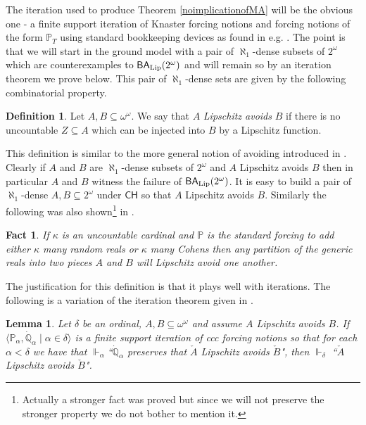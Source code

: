 \documentclass[leqno,11pt]{amsart}
\newtheorem{lemma}[theorem]{Lemma}
\newtheorem{fact}[theorem]{Fact}
\theoremstyle{definition}
\newtheorem{definition}[theorem]{Definition}
\theoremstyle{remark}
\def\forces{\Vdash}
\def\BA{\mathsf{BA}}
\def\baire{\omega^\omega}
\def\cantor{2^\omega}
\def\CH {\mathsf{CH}}
\def\Q{\mathbb Q}
\def\P{\mathbb P}
\begin{document}
The iteration used to produce Theorem \ref{noimplicationofMA} will be the obvious one - a finite support iteration of Knaster forcing notions and forcing notions of the form $\P_T$ using standard bookkeeping devices as found in e.g. \cite[Chapter 5]{KenST}. The point is that we will start in the ground model with a pair of $\aleph_1$-dense subsets of $\cantor$ which are counterexamples to $\BA_{\rm Lip}(\cantor)$ and will remain so by an iteration theorem we prove below. This pair of $\aleph_1$-dense sets are given by the following combinatorial property.

\begin{definition}
    Let $A, B \subseteq \baire$. We say that $A$ {\em Lipschitz avoids} $B$ if there is no uncountable $Z \subseteq A$ which can be injected into $B$ by a Lipschitz function.
\end{definition}

This definition is similar to the more general notion of avoiding introduced in \cite{weakBA}. Clearly if $A$ and $B$ are $\aleph_1$-dense subsets of $\cantor$ and $A$ Lipschitz avoids $B$ then in particular $A$ and $B$ witness the failure of $\BA_{\rm Lip} (\cantor)$. It is easy to build a pair of $\aleph_1$-dense $A, B \subseteq \cantor$ under $\CH$ so that $A$ Lipschitz avoids $B$. Similarly the following was also shown\footnote{Actually a stronger fact was proved but since we will not preserve the stronger property we do not bother to mention it.} in \cite{weakBA}.
\begin{fact}
    If $\kappa$ is an uncountable cardinal and $\P$ is the standard forcing to add either $\kappa$ many random reals or $\kappa$ many Cohens then any partition of the generic reals into two pieces $A$ and $B$ will Lipschitz avoid one another. 
\end{fact}

The justification for this definition is that it plays well with iterations. The following is a variation of the iteration theorem given in \cite[Theorem 5.9]{weakBA}.
\begin{lemma}
    Let $\delta$ be an ordinal, $A, B \subseteq \baire$ and assume $A$ Lipschitz avoids $B$. If $\langle \P_\alpha , \dot{\Q}_\alpha\; | \; \alpha \in \delta\rangle$ is a finite support iteration of ccc forcing notions so that for each $\alpha < \delta$ we have that $\forces_\alpha$``$\dot{\Q}_\alpha$ preserves that $\check{A}$ Lipschitz avoids $\check{B}$", then $\forces_\delta$ ``$\check{A}$ Lipschitz avoids $\check{B}$". \label{iteration}
\end{lemma}
\end{document}
